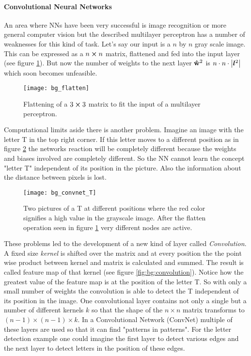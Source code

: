 \paragraph{Convolutional Neural Networks}
An area where NNs have been very successful is image recognition or more general computer vision but the described multilayer perceptron has a number of weaknesses for this kind of task. Let's say our input is a $n$ by $n$ gray scale image. This can be expressed as a $n \cp n$ matrix, flattened and fed into the input layer (see figure \ref{fig:bg:flatten}). But now the number of weights to the next layer $\vu{w}^2$ is $n \cdot n \cdot \qty| \boldsymbol l^2|$
which soon becomes unfeasible.

\begin{figure}[H]
    \centering
    \texttt{[image: bg\_flatten]}
    \caption{Flattening of a $3\cp3$ matrix to fit the input of a multilayer perceptron.}
    \label{fig:bg:flatten}
\end{figure}

Computational limits aside there is another problem. Imagine an image with the letter T in the top right corner. If this letter moves to a different position as in figure \ref{fig:bg:convnet_T} the networks reaction will be completely different because the weights and biases involved are completely different. So the NN cannot learn the concept "letter T" independent of its position in the picture. Also the information about the distance between pixels is lost.

\begin{figure}[H]
    \centering
    \texttt{[image: bg\_convnet\_T]}
    \caption{Two pictures of a T at different positions where the red color signifies a high value in the grayscale image. After the flatten operation seen in figure \ref{fig:bg:flatten} very different nodes are active.}
    \label{fig:bg:convnet_T}
\end{figure}

These problems led to the development of a new kind of layer called \textit{Convolution}. A fixed size \textit{kernel} is shifted over the matrix and at every position the the point wise product between kernel and matrix is calculated and summed. The result is called feature map of that kernel (see figure \ref{fig:bg:convolution}). Notice how the greatest value of the feature map is at the position of the letter T. So with only a small number of weights the convolution is able to detect the T independent of its position in the image. One convolutional layer contains not only a single but a number of different kernels $k$ so that the shape of the $n \times n$ matrix transforms to $(n-1) \times (n-1) \times k$. In a Convolutional Network (ConvNet) multiple of these layers are used so that it can find "patterns in patterns". For the letter detection example one could imagine the first layer to detect various edges and the next layer to detect letters in the position of these edges.

